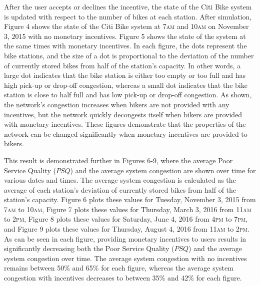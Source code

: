 \documentclass[times, 10pt,twocolumn]{article}
\begin{document}
After the user accepts or declines the incentive, the state of the Citi Bike system is updated with respect to the number of bikes at each station. After simulation, Figure 4 shows the state of the Citi Bike system at 7\textsc{am} and 10\textsc{am} on November 3, 2015 with no monetary incentives. Figure 5 shows the state of the system at the same times with monetary incentives. In each figure, the dots represent the bike stations, and the size of a dot is proportional to the deviation of the number of currently stored bikes from half of the station's capacity. In other words, a large dot indicates that the bike station is either too empty or too full and has high pick-up or drop-off congestion, whereas a small dot indicates that the bike station is close to half full and has low pick-up or drop-off congestion. As shown, the network's congestion increases when bikers are not provided with any incentives, but the network quickly decongests itself when bikers are provided with monetary incentives. These figures demonstrate that the properties of the network can be changed significantly when monetary incentives are provided to bikers.

This result is demonstrated further in Figures 6-9, where the average Poor Service Quality ($PSQ$) and the average system congestion are shown over time for various dates and times. The average system congestion is calculated as the average of each station's deviation of currently stored bikes from half of the station's capacity. Figure 6 plots these values for Tuesday, November 3, 2015 from 7\textsc{am} to 10\textsc{am}, Figure 7 plots these values for Thursday, March 3, 2016 from 11\textsc{am} to 2\textsc{pm}, Figure 8 plots these values for Saturday, June 4, 2016 from 4\textsc{pm} to 7\textsc{pm}, and Figure 9 plots these values for Thursday, August 4, 2016 from 11\textsc{am} to 2\textsc{pm}. As can be seen in each figure, providing monetary incentives to users results in significantly decreasing both the Poor Service Quality ($PSQ$) and the average system congestion over time. The average system congestion with no incentives remains between 50\% and 65\% for each figure, whereas the average system congestion with incentives decreases to between 35\% and 42\% for each figure.
\end{document}
